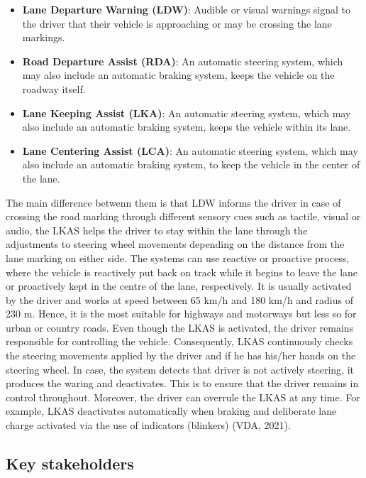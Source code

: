 \documentclass[
]{book}
\providecommand{\tightlist}{%
  \setlength{\itemsep}{0pt}\setlength{\parskip}{0pt}}
\begin{document}
\begin{itemize}
\tightlist
\item
  \textbf{Lane Departure Warning (LDW)}: Audible or visual warnings signal to the driver that their vehicle is approaching or may be crossing the lane markings.
\item
  \textbf{Road Departure Assist (RDA)}: An automatic steering system, which may also include an automatic braking system, keeps the vehicle on the roadway itself.
\item
  \textbf{Lane Keeping Assist (LKA)}: An automatic steering system, which may also include an automatic braking system, keeps the vehicle within its lane.
\item
  \textbf{Lane Centering Assist (LCA)}: An automatic steering system, which may also include an automatic braking system, to keep the vehicle in the center of the lane.
\end{itemize}

The main difference betwenn them is that LDW informs the driver in case of crossing the road marking through different sensory cues such as tactile, visual or audio, the LKAS helps the driver to stay within the lane through the adjustments to steering wheel movements depending on the distance from the lane marking on either side. The systems can use reactive or proactive process, where the vehicle is reactively put back on track while it begins to leave the lane or proactively kept in the centre of the lane, respectively. It is usually activated by the driver and works at speed between 65 km/h and 180 km/h and radius of 230 m. Hence, it is the most suitable for highways and motorways but less so for urban or country roads. Even though the LKAS is activated, the driver remains responsible for controlling the vehicle. Consequently, LKAS continuously checks the steering movements applied by the driver and if he has his/her hands on the steering wheel. In case, the system detects that driver is not actively steering, it produces the waring and deactivates. This is to ensure that the driver remains in control throughout. Moreover, the driver can overrule the LKAS at any time. For example, LKAS deactivates automatically when braking and deliberate lane charge activated via the use of indicators (blinkers) (VDA, 2021).

\hypertarget{key-stakeholders-25}{%
\subsection*{Key stakeholders}\label{key-stakeholders-25}}
\end{document}
